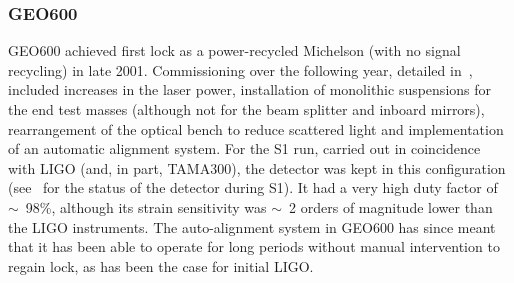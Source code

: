 \subsubsection{GEO600}


GEO600 achieved first lock as a power-recycled Michelson (with no signal
recycling) in late 2001. Commissioning over the following year,
detailed in~\cite{Hewitson:2003}, included increases in the laser
power, installation of monolithic suspensions for the end test masses
(although not for the beam splitter and inboard mirrors),
rearrangement of the optical bench to reduce scattered light and
implementation of an automatic alignment system. For the S1 run,
carried out in coincidence with LIGO (and, in part, TAMA300), the
detector was kept in this configuration (see~\cite{Abbott:2004a} for
the status of the detector during S1). It had a very high duty factor
of $\sim$~98\%, although its strain sensitivity was $\sim$~2 orders of
magnitude lower than the LIGO instruments. The auto-alignment system
in GEO600 has since meant that it has been able to operate for long
periods without manual intervention to regain lock, as has been the
case for initial LIGO.
